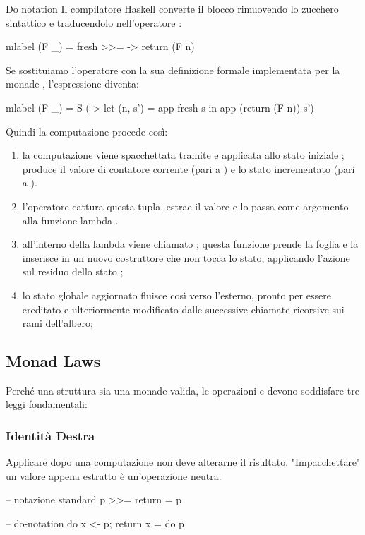 \begin{gframe}{Do notation}
Il compilatore Haskell converte il blocco  rimuovendo lo zucchero sintattico e traducendolo nell'operatore \code{>>=}:

\begin{haskellbox}{}
mlabel (F _) = fresh >>= \n -> return (F n)
\end{haskellbox}

Se sostituiamo l'operatore \code{>>=} con la sua definizione formale implementata per la monade , l'espressione diventa:
\begin{haskellbox}{}
mlabel (F _) = S (\s -> 
    let (n, s') = app fresh s 
    in app (return (F n)) s')
\end{haskellbox}

Quindi la computazione procede così:
\begin{enumerate}
    \item la computazione  viene spacchettata tramite  e applicata allo stato iniziale ; produce il valore di contatore corrente  (pari a ) e lo stato incrementato  (pari a ).
    \item l'operatore \code{>>=} cattura questa tupla, estrae il valore  e lo passa come argomento alla funzione lambda .
    \item all'interno della lambda viene chiamato ; questa funzione prende la foglia  e la inserisce in un nuovo costruttore  che non tocca lo stato, applicando l'azione sul residuo dello stato ;
    \item lo stato globale aggiornato  fluisce così verso l'esterno, pronto per essere ereditato e ulteriormente modificato dalle successive chiamate ricorsive sui rami dell'albero;
\end{enumerate}
\end{gframe}

\subsection{Monad Laws}
\label{monad_laws}
Perché una struttura sia una monade valida, le operazioni  e \code{>>=} devono soddisfare tre leggi fondamentali:

\subsubsection*{Identità Destra}
Applicare  dopo una computazione non deve alterarne il risultato. "Impacchettare" un valore appena estratto è un'operazione neutra.
\begin{haskellbox}{}
-- notazione standard
p >>= return = p

-- do-notation
do { x <- p; return x } = do { p }
\end{haskellbox}

